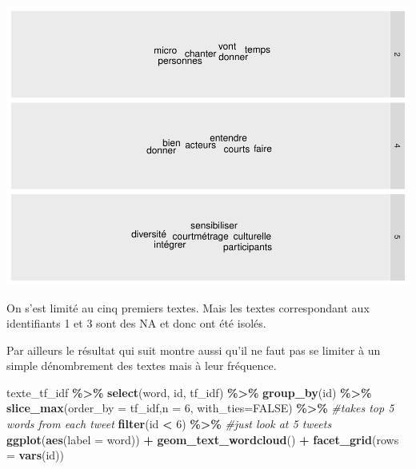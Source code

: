 \documentclass[
]{article}
\newenvironment{Shaded}{\begin{snugshade}}{\end{snugshade}}
\newcommand{\AttributeTok}[1]{\textcolor[rgb]{0.13,0.29,0.53}{#1}}
\newcommand{\CommentTok}[1]{\textcolor[rgb]{0.56,0.35,0.01}{\textit{#1}}}
\newcommand{\ConstantTok}[1]{\textcolor[rgb]{0.56,0.35,0.01}{#1}}
\newcommand{\DecValTok}[1]{\textcolor[rgb]{0.00,0.00,0.81}{#1}}
\newcommand{\FunctionTok}[1]{\textcolor[rgb]{0.13,0.29,0.53}{\textbf{#1}}}
\newcommand{\NormalTok}[1]{#1}
\newcommand{\SpecialCharTok}[1]{\textcolor[rgb]{0.81,0.36,0.00}{\textbf{#1}}}
\begin{document}
\includegraphics{Texte_mining_files/figure-latex/unnamed-chunk-17-1.pdf}

On s'est limité au cinq premiers textes. Mais les textes correspondant
aux identifiants 1 et 3 sont des NA et donc ont été isolés.

Par ailleurs le résultat qui suit montre aussi qu'il ne faut pas se
limiter à un simple dénombrement des textes mais à leur fréquence.

\begin{Shaded}
\begin{Highlighting}[]
\NormalTok{texte\_tf\_idf }\SpecialCharTok{\%\textgreater{}\%}
  \FunctionTok{select}\NormalTok{(word, id, tf\_idf) }\SpecialCharTok{\%\textgreater{}\%}
  \FunctionTok{group\_by}\NormalTok{(id) }\SpecialCharTok{\%\textgreater{}\%}
  \FunctionTok{slice\_max}\NormalTok{(}\AttributeTok{order\_by =}\NormalTok{ tf\_idf,}\AttributeTok{n =} \DecValTok{6}\NormalTok{, }\AttributeTok{with\_ties=}\ConstantTok{FALSE}\NormalTok{) }\SpecialCharTok{\%\textgreater{}\%} \CommentTok{\#takes top 5 words from each tweet}
  \FunctionTok{filter}\NormalTok{(id }\SpecialCharTok{\textless{}} \DecValTok{6}\NormalTok{) }\SpecialCharTok{\%\textgreater{}\%} \CommentTok{\#just look at 5 tweets}
  \FunctionTok{ggplot}\NormalTok{(}\FunctionTok{aes}\NormalTok{(}\AttributeTok{label =}\NormalTok{ word)) }\SpecialCharTok{+} 
  \FunctionTok{geom\_text\_wordcloud}\NormalTok{() }\SpecialCharTok{+} 
  \FunctionTok{facet\_grid}\NormalTok{(}\AttributeTok{rows =} \FunctionTok{vars}\NormalTok{(id))}
\end{Highlighting}
\end{Shaded}
\end{document}
